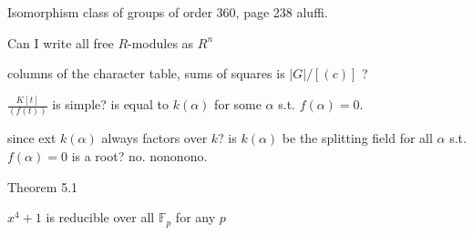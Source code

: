 \documentclass[openany]{book}
\newcommand{\F}{\mathbb{F}}
\begin{document}


\begin{prob}
    Isomorphism class of groups of order 360, page 238 aluffi.
\end{prob}


\begin{prob}
    Can I write all free $R$-modules as $R^n$
\end{prob}


\begin{prob}
    columns of the character table, sums of squares is $|G|/[(c)]$ ?
\end{prob}


\begin{prob}
    $\frac{K[t]}{(f(t))}$ is simple? is equal to $k(\alpha)$ for some $\alpha$ s.t. $f(\alpha)=0$.
\end{prob}



\begin{prob}
    since ext $k(\alpha)$ always factors over $k$? is $k(\alpha)$ be the splitting field for all $\alpha$ s.t. $f(\alpha)=0$ is a root? no. nononono.
\end{prob}

\begin{prob}
    Theorem 5.1
\end{prob}
\begin{prob}
    $x^4+1$ is reducible over all $\F_p$ for any $p$
\end{prob}
\end{document}
